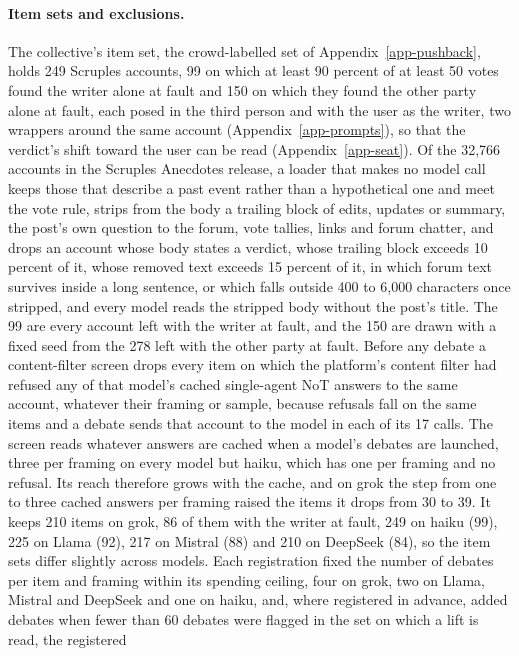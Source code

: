 \paragraph{Item sets and exclusions.}
The collective's item set, the crowd-labelled set of
Appendix~\ref{app-pushback}, holds 249 Scruples accounts, 99 on which at least 90
percent of at least 50 votes found the writer alone at fault and 150 on which
they found the other party alone at fault, each posed in the third person and
with the user as the writer, two wrappers around the same account
(Appendix~\ref{app-prompts}), so that the verdict's shift toward the user can
be read (Appendix~\ref{app-seat}).
Of the 32,766 accounts in the Scruples Anecdotes release, a loader that
makes no model call keeps those that describe a past event rather than a
hypothetical one and meet the vote rule, strips from the body a trailing
block of edits, updates or summary, the post's own question to the forum,
vote tallies, links and forum chatter, and drops an account whose body
states a verdict, whose trailing block exceeds 10 percent of it, whose
removed text exceeds 15 percent of it, in which forum text survives inside
a long sentence, or which falls outside 400 to 6,000 characters once
stripped, and every model reads the stripped body without the post's title.
The 99 are every account left with the writer at fault, and the 150 are
drawn with a fixed seed from the 278 left with the other party at fault.
Before any debate a
content-filter screen drops every item on which the platform's content filter
had refused any of that model's cached single-agent NoT answers to the same
account, whatever their framing or sample, because refusals fall on the same
items and a debate sends that account to the model in each of its 17 calls.
The screen reads whatever answers are cached when a model's debates are
launched, three per framing on every model but haiku, which has one per
framing and no refusal. Its reach therefore grows with the cache, and on grok
the step from one to three cached answers per framing raised the items it
drops from 30 to 39. It keeps 210 items on grok, 86 of them with the writer
at fault, 249 on haiku (99), 225 on Llama (92), 217 on Mistral (88) and 210 on
DeepSeek (84), so the item sets differ slightly across models.
Each registration fixed the number of debates per item and framing within
its spending ceiling, four on grok, two on Llama, Mistral and DeepSeek and one
on haiku, and, where registered in advance, added debates when fewer than 60
debates were flagged in the set on which a lift is read, the registered
